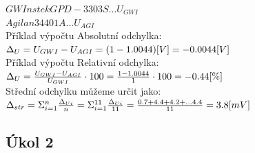\documentclass{article}
\begin{document}
\begin{figure}[H]
\begin{minipage}[t]{0.4\textwidth}
    \end{minipage}
    \hfill
    \begin{minipage}[t]{0.4\textwidth}
        \hspace{-10mm}
    \end{minipage}
\end{figure}

\vspace{5mm}
\(
    GWInstek GPD-3303S ... U_{GWI}
\)
\\
\vspace{5mm}
\(
    Agilan 34401A      ... U_{AGI}
\)\\
\vspace{5mm}
Příklad výpočtu Absolutní odchylka: 
\(
    \Delta_U = U_{GWI} - U_{AGI} = (1 - 1.0044)\-[V]= -0.0044\-[V]
\)\\
\vspace{5mm}
Příklad výpočtu Relativní odchylka: \(
    \Delta_U = \frac{U_{GWI} - U_{AGI}}{U_{GWI}}\cdot100 = \frac{1 - 1.0044}{1}\cdot100 = -0.44\-[\%]
\)\\
\vspace{5mm}
Střední odchylku můžeme určit jako:
\(
    \Delta_{str} = \Sigma_{i=1}^{n}\frac{\Delta_{Ui}}{n} = \Sigma_{i=1}^{11}\frac{\Delta_{Ui}}{11} = \frac{0.7 + 4.4 + 4.2 + ... 4.4}{11} = 3.8\-[mV]
\)

\subsection{Úkol 2}
\end{document}
